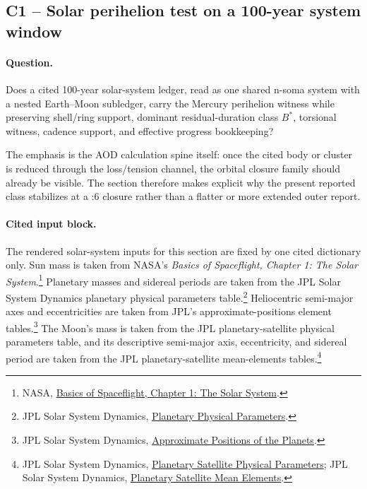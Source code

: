 \subsection{C1 -- Solar perihelion test on a 100-year system window}\label{suppc:c1-solar-perihelion}
\paragraph{Question.} Does a cited 100-year solar-system ledger, read as one shared n-soma system with a nested Earth--Moon subledger, carry the Mercury perihelion witness while preserving shell/ring support, dominant residual-duration class $B^*$, torsional witness, cadence support, and effective progress bookkeeping?

The emphasis is the AOD calculation spine itself: once the cited body or cluster is reduced through the loss/tension channel, the orbital closure family should already be visible. The section therefore makes explicit why the present reported class stabilizes at a :6 closure rather than a flatter or more extended outer report.

\paragraph{Cited input block.} The rendered solar-system inputs for this section are fixed by one cited dictionary only. Sun mass is taken from NASA's \emph{Basics of Spaceflight, Chapter 1: The Solar System}.\footnote{NASA, \href{https://science.nasa.gov/learn/basics-of-space-flight/chapter1-1/}{Basics of Spaceflight, Chapter 1: The Solar System}.} Planetary masses and sidereal periods are taken from the JPL Solar System Dynamics planetary physical parameters table.\footnote{JPL Solar System Dynamics, \href{https://ssd.jpl.nasa.gov/planets/phys_par.html}{Planetary Physical Parameters}.} Heliocentric semi-major axes and eccentricities are taken from JPL's approximate-positions element tables.\footnote{JPL Solar System Dynamics, \href{https://ssd.jpl.nasa.gov/planets/approx_pos.html}{Approximate Positions of the Planets}.} The Moon's mass is taken from the JPL planetary-satellite physical parameters table, and its descriptive semi-major axis, eccentricity, and sidereal period are taken from the JPL planetary-satellite mean-elements tables.\footnote{JPL Solar System Dynamics, \href{https://ssd.jpl.nasa.gov/sats/phys_par/}{Planetary Satellite Physical Parameters}; JPL Solar System Dynamics, \href{https://ssd.jpl.nasa.gov/sats/elem/}{Planetary Satellite Mean Elements}.}

